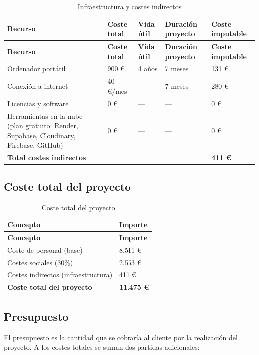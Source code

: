 \begin{longtable}{p{4.5cm}p{2.5cm}p{2cm}p{2.5cm}p{2.5cm}}
\caption{Infraestructura y costes indirectos}\label{tab:costes_indirectos}\\
\toprule
\textbf{Recurso} & \textbf{Coste total} & \textbf{Vida útil} & \textbf{Duración proyecto} & \textbf{Coste imputable} \\
\midrule
\endfirsthead
\toprule
\textbf{Recurso} & \textbf{Coste total} & \textbf{Vida útil} & \textbf{Duración proyecto} & \textbf{Coste imputable} \\
\midrule
\endhead
\bottomrule
\endlastfoot
Ordenador portátil & 900 € & 4 años & 7 meses & 131 € \\
Conexión a internet & 40 €/mes & — & 7 meses & 280 € \\
Licencias y software & 0 € & — & — & 0 € \\
Herramientas en la nube (plan gratuito: Render, Supabase, Cloudinary, Firebase, GitHub) & 0 € & — & — & 0 € \\
\midrule
\textbf{Total costes indirectos} & & & & \textbf{411 €} \\
\end{longtable}

\subsection{Coste total del proyecto}

\begin{longtable}{p{8cm}p{4cm}}
\caption{Coste total del proyecto}\label{tab:coste_total_proyecto}\\
\toprule
\textbf{Concepto} & \textbf{Importe} \\
\midrule
\endfirsthead
\toprule
\textbf{Concepto} & \textbf{Importe} \\
\midrule
\endhead
\bottomrule
\endlastfoot
Coste de personal (base) & 8.511 € \\
Costes sociales (30\%) & 2.553 € \\
Costes indirectos (infraestructura) & 411 € \\
\midrule
\textbf{Coste total del proyecto} & \textbf{11.475 €} \\
\end{longtable}

\subsection{Presupuesto}

El presupuesto es la cantidad que se cobraría al cliente por la realización del proyecto. A los costes totales se suman dos partidas adicionales:

